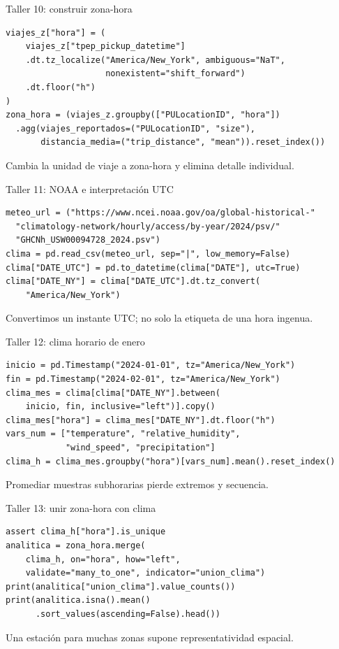 \documentclass[aspectratio=169,11pt]{beamer}
\begin{document}
\begin{frame}[fragile]{Taller 10: construir zona-hora}
\begin{verbatim}
viajes_z["hora"] = (
    viajes_z["tpep_pickup_datetime"]
    .dt.tz_localize("America/New_York", ambiguous="NaT",
                    nonexistent="shift_forward")
    .dt.floor("h")
)
zona_hora = (viajes_z.groupby(["PULocationID", "hora"])
  .agg(viajes_reportados=("PULocationID", "size"),
       distancia_media=("trip_distance", "mean")).reset_index())
\end{verbatim}
  \small Cambia la unidad de viaje a zona-hora y elimina detalle individual.
\end{frame}

\begin{frame}[fragile]{Taller 11: NOAA e interpretación UTC}
\begin{verbatim}
meteo_url = ("https://www.ncei.noaa.gov/oa/global-historical-"
  "climatology-network/hourly/access/by-year/2024/psv/"
  "GHCNh_USW00094728_2024.psv")
clima = pd.read_csv(meteo_url, sep="|", low_memory=False)
clima["DATE_UTC"] = pd.to_datetime(clima["DATE"], utc=True)
clima["DATE_NY"] = clima["DATE_UTC"].dt.tz_convert(
    "America/New_York")
\end{verbatim}
  \small Convertimos un instante UTC; no solo la etiqueta de una hora ingenua.
\end{frame}

\begin{frame}[fragile]{Taller 12: clima horario de enero}
\begin{verbatim}
inicio = pd.Timestamp("2024-01-01", tz="America/New_York")
fin = pd.Timestamp("2024-02-01", tz="America/New_York")
clima_mes = clima[clima["DATE_NY"].between(
    inicio, fin, inclusive="left")].copy()
clima_mes["hora"] = clima_mes["DATE_NY"].dt.floor("h")
vars_num = ["temperature", "relative_humidity",
            "wind_speed", "precipitation"]
clima_h = clima_mes.groupby("hora")[vars_num].mean().reset_index()
\end{verbatim}
  \small Promediar muestras subhorarias pierde extremos y secuencia.
\end{frame}

\begin{frame}[fragile]{Taller 13: unir zona-hora con clima}
\begin{verbatim}
assert clima_h["hora"].is_unique
analitica = zona_hora.merge(
    clima_h, on="hora", how="left",
    validate="many_to_one", indicator="union_clima")
print(analitica["union_clima"].value_counts())
print(analitica.isna().mean()
      .sort_values(ascending=False).head())
\end{verbatim}
  \small Una estación para muchas zonas supone representatividad espacial.
\end{frame}
\end{document}
